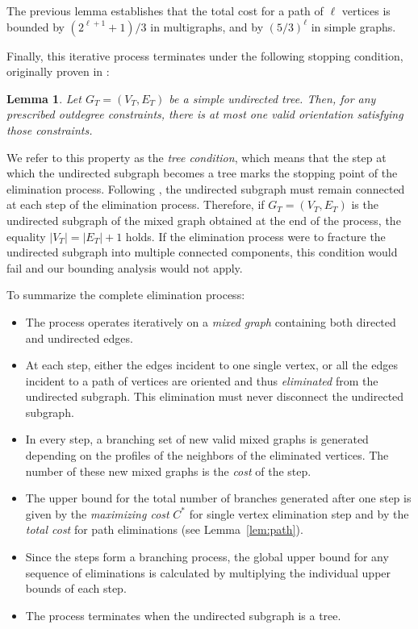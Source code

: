 \documentclass{article}
\newtheorem{lemma}{Lemma}
\begin{document}
        The previous lemma establishes that the total cost for a path of $\ell$ vertices is bounded by $(2^{\ell+1}+1)/3$ in multigraphs, and by $(5/3)^\ell$ in simple graphs.
     
        Finally, this iterative process terminates under the following stopping condition, originally proven in \cite{bev}:
        \begin{lemma}\label{lem:tree}
            Let $G_T=(V_T,E_T)$ be a simple undirected tree.  
            Then, for any prescribed outdegree constraints, there is at most one valid orientation satisfying those constraints.
        \end{lemma}
        
        We refer to this property as the \emph{tree condition}, which means that the step at which the undirected subgraph becomes a tree marks the stopping point of the elimination process.  
        Following \cite{bev,bet}, the undirected subgraph must remain connected at each step of the elimination process.  
        Therefore, if $G_T=(V_T,E_T)$ is the undirected subgraph of the mixed graph obtained at the end of the process, the equality $|V_T|=|E_T|+1$ holds.
        If the elimination process were to fracture the undirected subgraph into multiple connected components, this condition would fail and our bounding analysis would not apply.
        
        
        To summarize the complete elimination process:
        \begin{itemize}
            \item[a.] The process operates iteratively on a \emph{mixed graph} containing both directed and undirected edges.
            \item[b.] At each step, either the edges incident to one single vertex, or all the edges incident to a path of vertices are oriented and thus \emph{eliminated} from the undirected subgraph.
            This elimination must never disconnect the undirected subgraph.
            \item[c. ] In every step, a branching set of new valid mixed graphs is generated depending on the profiles of the neighbors of the eliminated vertices.
            The number of these new mixed graphs is the \emph{cost} of the step.
            \item[d.] The upper bound for the total number of branches generated after one step is given by the \emph{maximizing cost} $C^*$ for single vertex elimination step and by the \emph{total cost} for path eliminations (see Lemma~\ref{lem:path}).
            \item[e.] Since the steps form a branching process, the global upper bound for any sequence of eliminations is calculated by multiplying the individual upper bounds of each step.
            \item[f.] The process terminates when the undirected subgraph is a tree.
            
        \end{itemize}
\end{document}
